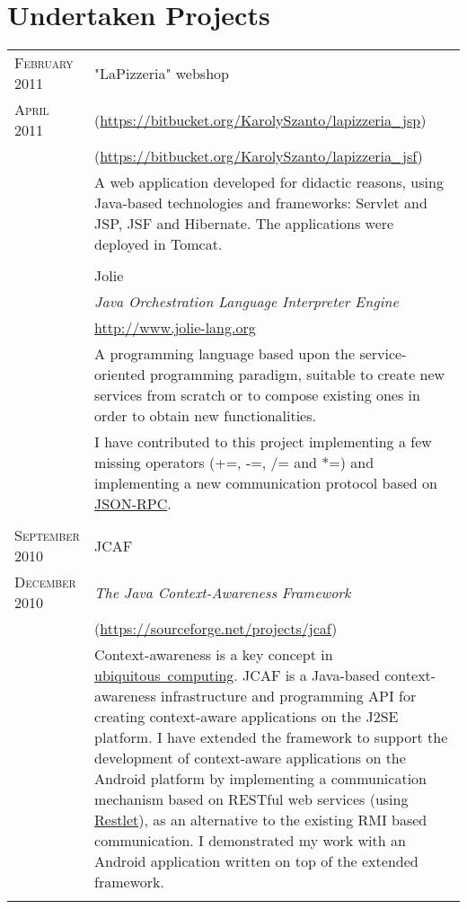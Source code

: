 \documentclass[a4paper,10pt]{article}
\begin{document}
\section{Undertaken Projects}
\begin{longtable}{p{2.5cm}|p{11cm}}
 \raggedleft \textsc{February 2011} & "LaPizzeria" webshop\\
 \raggedleft \textsc{April 2011} & \footnotesize{(\url{https://bitbucket.org/KarolySzanto/lapizzeria_jsp})}\\
 & \footnotesize{(\url{https://bitbucket.org/KarolySzanto/lapizzeria_jsf})}\\
 & \footnotesize{A web application developed for didactic reasons, using Java-based technologies and frameworks: Servlet and JSP, JSF and Hibernate. The applications were deployed in Tomcat.}\\
 \multicolumn{2}{c}{} \\

 & Jolie\\
 & \emph{Java Orchestration Language Interpreter Engine}\\
 & \footnotesize{\url{http://www.jolie-lang.org}}\\
 & \footnotesize{A programming language based upon the service-oriented programming paradigm, suitable to create new services from scratch or to compose existing ones in order to obtain new functionalities.}\\

 & \footnotesize{I have contributed to this project implementing a few missing operators (+=, -=, /= and *=) and implementing a new communication protocol based on \href{http://json-rpc.org/}{JSON-RPC}.}\\
 \multicolumn{2}{c}{} \\

 \raggedleft \textsc{September 2010} & JCAF\\
 \raggedleft \textsc{December 2010} & \emph{The Java Context-Awareness
 Framework} \\ 
 & \footnotesize{(\url{https://sourceforge.net/projects/jcaf})}\\
 & \footnotesize{Context-awareness is a key concept in
 \href{http://en.wikipedia.org/wiki/Ubiquitous_computing}{ubiquitous~computing}.
 JCAF is a Java-based context-awareness infrastructure and programming API for
 creating context-aware applications on the J2SE platform. I have extended the
 framework to support the development of context-aware applications on the
 Android platform by implementing a communication mechanism based on RESTful
 web services (using \href{http://www.restlet.org/}{Restlet}), as an alternative
 to the existing RMI based communication. I demonstrated my work with an
 Android application written on top of the extended framework.}\\
 \multicolumn{2}{c}{} \\
 

\end{longtable}
\end{document}
